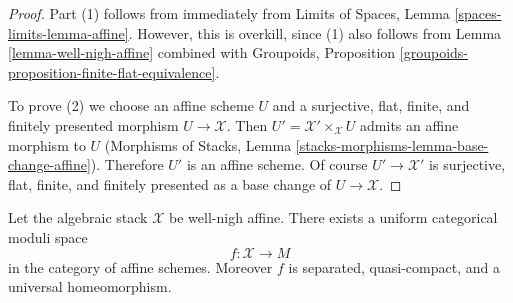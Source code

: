 \begin{proof}
Part (1) follows from immediately from
Limits of Spaces, Lemma \ref{spaces-limits-lemma-affine}.
However, this is overkill, since (1) also follows from
Lemma \ref{lemma-well-nigh-affine} combined with
Groupoids, Proposition
\ref{groupoids-proposition-finite-flat-equivalence}.

\medskip\noindent
To prove (2) we choose an affine scheme $U$ and a
surjective, flat, finite, and finitely presented morphism $U \to \mathcal{X}$.
Then $U' = \mathcal{X}' \times_\mathcal{X} U$ admits an affine
morphism to $U$ (Morphisms of Stacks, Lemma
\ref{stacks-morphisms-lemma-base-change-affine}).
Therefore $U'$ is an affine scheme. Of course
$U' \to \mathcal{X}'$ is surjective, flat, finite, and finitely presented
as a base change of $U \to \mathcal{X}$.
\end{proof}

\begin{lemma}
\label{lemma-well-nigh-affine-moduli-space}
Let the algebraic stack $\mathcal{X}$ be well-nigh affine. There exists
a uniform categorical moduli space
$$
f : \mathcal{X} \longrightarrow M
$$
in the category of affine schemes. Moreover
$f$ is separated, quasi-compact, and a universal homeomorphism.
\end{lemma}

